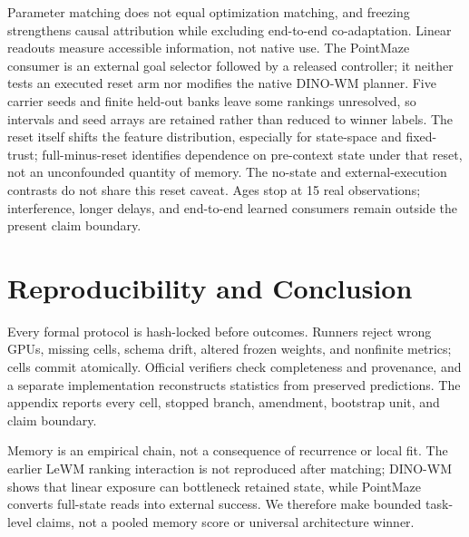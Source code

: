 Parameter matching does not equal optimization matching, and freezing
strengthens causal attribution while excluding end-to-end co-adaptation.
Linear readouts measure accessible information, not native use.  The PointMaze
consumer is an external goal selector followed by a released controller; it
neither tests an executed reset arm nor modifies the native DINO-WM planner.
Five carrier seeds and finite held-out banks leave some rankings unresolved, so
intervals and seed arrays are retained rather than reduced to winner labels.
The reset itself shifts the feature distribution, especially for state-space
and fixed-trust; full-minus-reset identifies dependence on pre-context state
under that reset, not an unconfounded quantity of memory.  The no-state and
external-execution contrasts do not share this reset caveat.  Ages stop at 15
real observations; interference, longer delays, and end-to-end learned
consumers remain outside the present claim boundary.

\section{Reproducibility and Conclusion}

Every formal protocol is hash-locked before outcomes.  Runners reject wrong
GPUs, missing cells, schema drift, altered frozen weights, and nonfinite metrics;
cells commit atomically.  Official verifiers check completeness and provenance,
and a separate implementation reconstructs statistics from preserved
predictions.  The appendix reports every cell, stopped branch, amendment,
bootstrap unit, and claim boundary.

Memory is an empirical chain, not a consequence of recurrence or local fit.
The earlier LeWM ranking interaction is not reproduced after matching;
DINO-WM shows that linear exposure can bottleneck retained state, while
PointMaze converts full-state reads into external success.  We therefore make
bounded task-level claims, not a pooled memory score or universal architecture
winner.
